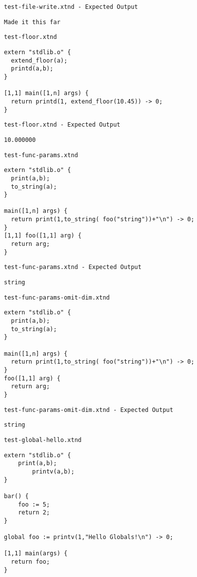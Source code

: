 \medskip \noindent \texttt{test-file-write.xtnd - Expected Output}


\begin{lstlisting}
Made it this far
\end{lstlisting}


\medskip \noindent \texttt{test-floor.xtnd}


\begin{lstlisting}
extern "stdlib.o" {
  extend_floor(a);
  printd(a,b);
}

[1,1] main([1,n] args) {
  return printd(1, extend_floor(10.45)) -> 0;
}
\end{lstlisting}


\medskip \noindent \texttt{test-floor.xtnd - Expected Output}


\begin{lstlisting}
10.000000
\end{lstlisting}


\medskip \noindent \texttt{test-func-params.xtnd}


\begin{lstlisting}
extern "stdlib.o" {
  print(a,b);
  to_string(a);
}

main([1,n] args) {
  return print(1,to_string( foo("string"))+"\n") -> 0;
}
[1,1] foo([1,1] arg) {
  return arg;
}
\end{lstlisting}


\medskip \noindent \texttt{test-func-params.xtnd - Expected Output}


\begin{lstlisting}
string
\end{lstlisting}


\medskip \noindent \texttt{test-func-params-omit-dim.xtnd}


\begin{lstlisting}
extern "stdlib.o" {
  print(a,b);
  to_string(a);
}

main([1,n] args) {
  return print(1,to_string( foo("string"))+"\n") -> 0;
}
foo([1,1] arg) {
  return arg;
}
\end{lstlisting}


\medskip \noindent \texttt{test-func-params-omit-dim.xtnd - Expected Output}


\begin{lstlisting}
string
\end{lstlisting}


\medskip \noindent \texttt{test-global-hello.xtnd}


\begin{lstlisting}
extern "stdlib.o" {
	print(a,b);
		printv(a,b);
}

bar() {
	foo := 5;
	return 2;
}

global foo := printv(1,"Hello Globals!\n") -> 0;

[1,1] main(args) {
  return foo;
}
\end{lstlisting}


